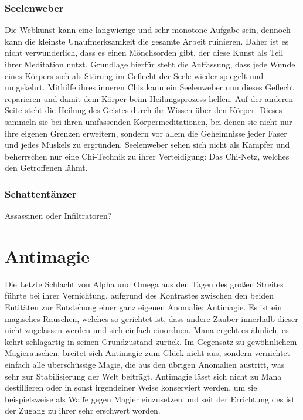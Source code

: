 \documentclass[a4paper,12pt,oneside]{book}
\begin{document}
\subsection{Seelenweber}
Die Webkunst kann eine langwierige und sehr monotone Aufgabe sein, dennoch kann die kleinste Unaufmerksamkeit die gesamte Arbeit ruinieren. Daher ist es nicht verwunderlich, dass es einen Mönchsorden gibt, der diese Kunst als Teil ihrer Meditation nutzt. Grundlage hierfür steht die Auffassung, dass jede Wunde eines Körpers sich als Störung im Geflecht der Seele wieder spiegelt und umgekehrt. Mithilfe ihres inneren Chis kann ein Seelenweber nun dieses Geflecht reparieren und damit dem Körper beim Heilungsprozess helfen. Auf der anderen Seite steht die Heilung des Geistes durch ihr Wissen über den Körper. Dieses sammeln sie bei ihren umfassenden Körpermeditationen, bei denen sie nicht nur ihre eigenen Grenzen erweitern, sondern vor allem die Geheimnisse jeder Faser und jedes Muskels zu ergründen. Seelenweber sehen sich nicht als Kämpfer und beherrschen nur eine Chi-Technik zu ihrer Verteidigung: Das Chi-Netz, welches den Getroffenen lähmt.

\subsection{Schattentänzer}
Assassinen oder Infiltratoren?

\chapter{Antimagie}\label{Antimagie}
Die Letzte Schlacht von Alpha und Omega aus den Tagen des großen Streites führte bei ihrer Vernichtung, aufgrund des Kontrastes zwischen den beiden Entitäten zur Entstehung einer ganz eigenen Anomalie: Antimagie. Es ist ein magisches Rauschen, welches so gerichtet ist, dass andere Zauber innerhalb dieser nicht zugelassen werden und sich einfach einordnen. Mana ergeht es ähnlich, es kehrt schlagartig in seinen Grundzustand zurück. Im Gegensatz zu gewöhnlichem Magierauschen, breitet sich Antimagie zum Glück nicht aus, sondern vernichtet einfach alle überschüssige Magie, die aus den übrigen Anomalien austritt, was sehr zur Stabilisierung der Welt beiträgt. Antimagie lässt sich nicht zu Mana destillieren oder in sonst irgendeiner Weise konserviert werden, um sie beispielsweise als Waffe gegen Magier einzusetzen und seit der Errichtung des  ist der Zugang zu ihrer sehr erschwert worden. 
\end{document}
